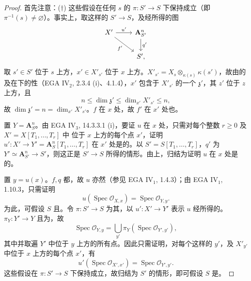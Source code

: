 \begin{proof}
首先注意：($\dagger$) 这些假设在任何 $s$ 的 $\pi:S'\to S$ 下保持成立（即 $\pi^{-1}(s)\ne\varnothing$）。事实上，取这样的 $S'\to S$，及经所得的图
\[
\begin{tikzcd}
X'\arrow[r,"u'"]\arrow[dr,"f'"']&\mathbf A_{S'}^n\arrow[d,"q'"]\\
&S',
\end{tikzcd}
\]
取 $s'\in S'$ 位于 $s$ 上方，$x'\in X'_{s'}$ 位于 $x$ 上方。$X'_{s'}=X_s\otimes_{\kappa(s)}\kappa(s')$，故由的及在下的性（EGA IV$_2$, 2.3.4 (i)、4.1.4），$x'$ 包含于 $X'_{s'}$ 的一个 $\mathfrak z'$，其 $z'$ 位于 $z$ 上方，且
\[
n\leq\dim\mathfrak z'\leq\dim_{x'}X'_{s'}\leq n,
\]
故 $\dim\mathfrak z'=n=\dim_{x'}X'_{s'}$。$f$ 在 $x$ 处，故 $f'$ 在 $x'$ 处也。

置 $Y=\mathbf A_S^n$。由 EGA IV$_3$, 14.3.3.1 (i)，要证 $u$ 在 $x$ 处，只需对每个整数 $r\geq0$ 及 $X'=X[T_1,\ldots,T_r]$ 中
位于 $x$ 上方的每个点 $x'$，证明 $u':X'\to Y'=\mathbf A_S^n[T_1,\ldots,T_r]$ 在 $x'$ 处是的。以 $S'=S[T_1,\ldots,T_r]$，$q'$ 为 $Y'\simeq\mathbf A_{S'}^n\to S'$，则这正是 $S'\to S$ 所得的情形。由上，归结为证明 $u$ 在 $x$ 处是的。

置 $y=u(x)$。$f,q$ 都，故 $u$ 亦然（参见 EGA IV$_1$, 1.4.3）；由 EGA IV$_1$, 1.10.3，只需证明
\[
u(\operatorname{Spec}\mathcal O_{X,x})=\operatorname{Spec}\mathcal O_{Y,y}.
\]
为此，可假设 $S$ 且。令 $\pi:S'\to S$ 为其，以 $u':X'\to Y'$ 表示 $u$ 经所得的。$\pi_Y:Y'\to Y$ 且为，故
\[
\operatorname{Spec}\mathcal O_{Y,y}
=\bigcup_{y'}\pi_Y(\operatorname{Spec}\mathcal O_{Y',y'}),
\]
其中并取遍 $Y'$ 中位于 $y$ 上方的所有点。因此只需证明，对每个这样的 $y'$，及 $X'_{y'}$ 中位于 $x$ 上方的每个点 $x'$，有
\[
u'(\operatorname{Spec}\mathcal O_{X',x'})=\operatorname{Spec}\mathcal O_{Y',y'}.
\]
这些假设在 $\pi:S'\to S$ 下保持成立，故归结为 $S'$ 的情形，即可假设 $S$ 是。


\end{proof}
